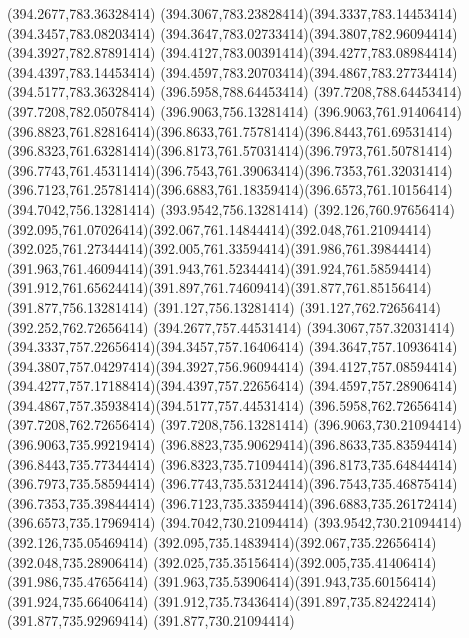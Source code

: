 {{	\lineto(394.2677,783.36328414)
	\curveto(394.3067,783.23828414)(394.3337,783.14453414)(394.3457,783.08203414)
	\curveto(394.3647,783.02733414)(394.3807,782.96094414)(394.3927,782.87891414)
	\curveto(394.4127,783.00391414)(394.4277,783.08984414)(394.4397,783.14453414)
	\curveto(394.4597,783.20703414)(394.4867,783.27734414)(394.5177,783.36328414)
	\lineto(396.5958,788.64453414)
	\lineto(397.7208,788.64453414)
	\lineto(397.7208,782.05078414)
	\closepath
	\moveto(396.9063,756.13281414)
	\lineto(396.9063,761.91406414)
	\curveto(396.8823,761.82816414)(396.8633,761.75781414)(396.8443,761.69531414)
	\curveto(396.8323,761.63281414)(396.8173,761.57031414)(396.7973,761.50781414)
	\curveto(396.7743,761.45311414)(396.7543,761.39063414)(396.7353,761.32031414)
	\curveto(396.7123,761.25781414)(396.6883,761.18359414)(396.6573,761.10156414)
	\lineto(394.7042,756.13281414)
	\lineto(393.9542,756.13281414)
	\lineto(392.126,760.97656414)
	\curveto(392.095,761.07026414)(392.067,761.14844414)(392.048,761.21094414)
	\curveto(392.025,761.27344414)(392.005,761.33594414)(391.986,761.39844414)
	\curveto(391.963,761.46094414)(391.943,761.52344414)(391.924,761.58594414)
	\curveto(391.912,761.65624414)(391.897,761.74609414)(391.877,761.85156414)
	\lineto(391.877,756.13281414)
	\lineto(391.127,756.13281414)
	\lineto(391.127,762.72656414)
	\lineto(392.252,762.72656414)
	\lineto(394.2677,757.44531414)
	\curveto(394.3067,757.32031414)(394.3337,757.22656414)(394.3457,757.16406414)
	\curveto(394.3647,757.10936414)(394.3807,757.04297414)(394.3927,756.96094414)
	\curveto(394.4127,757.08594414)(394.4277,757.17188414)(394.4397,757.22656414)
	\curveto(394.4597,757.28906414)(394.4867,757.35938414)(394.5177,757.44531414)
	\lineto(396.5958,762.72656414)
	\lineto(397.7208,762.72656414)
	\lineto(397.7208,756.13281414)
	\closepath
	\moveto(396.9063,730.21094414)
	\lineto(396.9063,735.99219414)
	\curveto(396.8823,735.90629414)(396.8633,735.83594414)(396.8443,735.77344414)
	\curveto(396.8323,735.71094414)(396.8173,735.64844414)(396.7973,735.58594414)
	\curveto(396.7743,735.53124414)(396.7543,735.46875414)(396.7353,735.39844414)
	\curveto(396.7123,735.33594414)(396.6883,735.26172414)(396.6573,735.17969414)
	\lineto(394.7042,730.21094414)
	\lineto(393.9542,730.21094414)
	\lineto(392.126,735.05469414)
	\curveto(392.095,735.14839414)(392.067,735.22656414)(392.048,735.28906414)
	\curveto(392.025,735.35156414)(392.005,735.41406414)(391.986,735.47656414)
	\curveto(391.963,735.53906414)(391.943,735.60156414)(391.924,735.66406414)
	\curveto(391.912,735.73436414)(391.897,735.82422414)(391.877,735.92969414)
	\lineto(391.877,730.21094414)
}}
